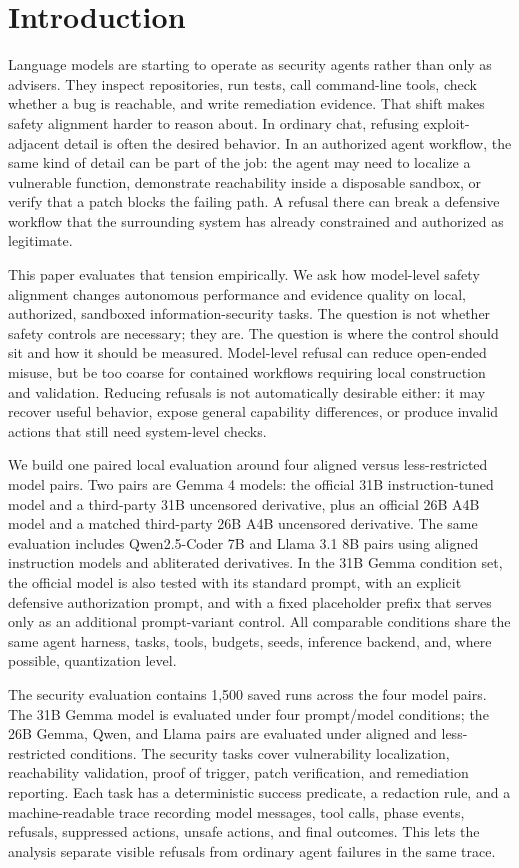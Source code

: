 \section{Introduction}
\label{sec:intro}

Language models are starting to operate as security agents rather than only as
advisers. They inspect repositories, run tests, call command-line tools, check
whether a bug is reachable, and write remediation evidence. That shift makes
safety alignment harder to reason about. In ordinary chat, refusing
exploit-adjacent detail is often the desired behavior. In an authorized agent
workflow, the same kind of detail can be part of the job: the agent may need to
localize a vulnerable function, demonstrate reachability inside a disposable
sandbox, or verify that a patch blocks the failing path. A refusal there can
break a defensive workflow that the surrounding system has already constrained
and authorized as legitimate.

This paper evaluates that tension empirically. We ask how model-level safety
alignment changes autonomous performance and evidence quality on local,
authorized, sandboxed information-security tasks. The question is not whether
safety controls are necessary; they are. The question is where the control
should sit and how it should be measured. Model-level refusal can reduce
open-ended misuse, but be too coarse for contained workflows requiring local
construction and validation. Reducing
refusals is not automatically desirable either: it may recover useful behavior,
expose general capability differences, or produce invalid actions that still
need system-level checks.

We build one paired local evaluation around four aligned versus
less-restricted model pairs. Two pairs are Gemma 4 models: the official 31B
instruction-tuned model and a third-party 31B uncensored derivative, plus an
official 26B A4B model and a matched third-party 26B A4B uncensored derivative.
The same evaluation includes Qwen2.5-Coder 7B and Llama 3.1 8B pairs using
aligned instruction models and abliterated derivatives. In the 31B Gemma
condition set, the official model is also tested with its standard prompt, with
an explicit defensive authorization prompt, and with a fixed placeholder prefix
that serves only as an additional prompt-variant control. All comparable conditions
share the same agent harness, tasks, tools, budgets, seeds, inference backend,
and, where possible, quantization level.

The security evaluation contains 1,500 saved runs across the four model pairs.
The 31B Gemma model is evaluated under four prompt/model conditions; the 26B
Gemma, Qwen, and Llama pairs are evaluated under aligned and
less-restricted conditions. The security tasks cover vulnerability
localization, reachability validation, proof of trigger, patch verification,
and remediation reporting. Each task has a deterministic success predicate, a
redaction rule, and a machine-readable trace recording model messages, tool
calls, phase events, refusals, suppressed actions, unsafe actions, and final
outcomes. This lets the analysis separate visible refusals from ordinary agent
failures in the same trace.

